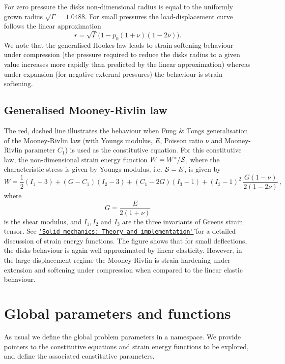 For zero pressure the disk\textquotesingle{}s non-\/dimensional radius is equal to the uniformly grown radius $ \sqrt{\Gamma} = 1.0488. $ For small pressures the load-\/displacement curve follows the linear approximation \[ r = \sqrt{\Gamma} \big( 1-p_0 (1+\nu)(1-2\nu) \big). \] We note that the generalised Hooke\textquotesingle{}s law leads to strain softening behaviour under compression (the pressure required to reduce the disk\textquotesingle{}s radius to a given value increases more rapidly than predicted by the linear approximation) whereas under expansion (for negative external pressures) the behaviour is strain softening.\hypertarget{index_mr}{}\subsection{Generalised Mooney-\/\+Rivlin law}\label{index_mr}
The red, dashed line illustrates the behaviour when Fung \& Tong\textquotesingle{}s generalisation of the Mooney-\/\+Rivlin law (with Young\textquotesingle{}s modulus, $ E $, Poisson ratio $ \nu $ and Mooney-\/\+Rivlin parameter $ C_1$) is used as the constitutive equation. For this constitutive law, the non-\/dimensional strain energy function $ W = W^*/{\cal S}$, where the characteristic stress is given by Young\textquotesingle{}s modulus, i.\+e. $ {\cal S} =E $, is given by \[ W = \frac{1}{2} (I_1-3) + (G-C_1)(I_2-3) + (C_1-2G)(I_3-1) + (I_3-1)^2 \ \frac{G(1-\nu)}{2(1-2\nu)} \ , \] where \[ G = \frac{E}{2(1+\nu)} \] is the shear modulus, and $ I_1, I_2 $ and $ I_3 $ are the three invariants of Green\textquotesingle{}s strain tensor. See \href{../../solid_theory/html/index.html#strain-energy}{\tt \char`\"{}\+Solid mechanics\+: Theory and implementation\char`\"{}} for a detailed discussion of strain energy functions. The figure shows that for small deflections, the disk\textquotesingle{}s behaviour is again well approximated by linear elasticity. However, in the large-\/displacement regime the Mooney-\/\+Rivlin is strain hardening under extension and softening under compression when compared to the linear elastic behaviour.



 

\hypertarget{index_namespace}{}\section{Global parameters and functions}\label{index_namespace}
As usual we define the global problem parameters in a namespace. We provide pointers to the constitutive equations and strain energy functions to be explored, and define the associated constitutive parameters.

